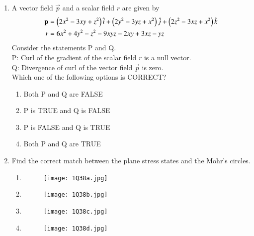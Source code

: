 \documentclass[journal,12pt,onecolumn]{article}
\theoremstyle{remark}
\begin{document}
\begin{enumerate}
    \item A vector field $\vec{p}$ and a scalar field $r$ are given by
    \begin{align}
        \mathbf{p} &= \left(2x^2 - 3xy + z^2\right)\hat{i} + \left(2y^2 - 3yz + x^2\right)\hat{j} + \left(2z^2 - 3xz + x^2\right)\hat{k} \\
        r &= 6x^2 + 4y^2 - z^2 - 9xyz - 2xy + 3xz - yz
    \end{align}
    Consider the statements P and Q. \\
    P: Curl of the gradient of the scalar field $r$ is a null vector. \\
    Q: Divergence of curl of the vector field $\vec{p}$ is zero. \\
    Which one of the following options is CORRECT?
    
    \hfill{}
    \begin{enumerate}
        \item Both P and Q are FALSE
        \item P is TRUE and Q is FALSE
        \item P is FALSE and Q is TRUE
        \item Both P and Q are TRUE
    \end{enumerate}
    
    \item Find the correct match between the plane stress states and the Mohr's circles.
    \begin{enumerate}
        \item \begin{figure}[H]
        \centering
        \texttt{[image: 1Q38a.jpg]}
        \caption{}
        \label{fig:q39}
    \end{figure}
    \item \begin{figure}[H]
        \centering
        \texttt{[image: 1Q38b.jpg]}
        \caption{}
        \label{fig:q39}
    \end{figure}
    \item \begin{figure}[H]
        \centering
        \texttt{[image: 1Q38c.jpg]}
        \caption{}
        \label{fig:q39}
    \end{figure}
    \item \begin{figure}[H]
        \centering
        \texttt{[image: 1Q38d.jpg]}
        \caption{}
        \label{fig:q39}
    \end{figure}    
    \end{enumerate}
    

\end{enumerate}
\end{document}
